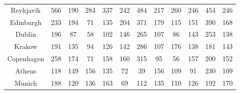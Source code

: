 \documentclass[12pt]{article}
\begin{document}
\begin{landscape}
\begin{table}[h]
\begin{tabular}{c|c|c|c|c|c|c|c|c|c|c|c}
Reykjavik & 566 & 190 & 284 & 337 & 242 & 484 & 217 & 260 & 246 & 454 & 246 \\
Edinburgh & 233 & 194 & 71 & 135 & 204 & 371 & 179 & 115 & 151 & 390 & 168 \\
Dublin & 196 & 87 & 58 & 102 & 146 & 265 & 107 & 86 & 143 & 253 & 138 \\
Krakow & 191 & 135 & 94 & 126 & 142 & 286 & 107 & 176 & 138 & 181 & 143 \\
Copenhagen & 258 & 174 & 71 & 158 & 160 & 315 & 95 & 56 & 157 & 200 & 152 \\
Athens & 118 & 149 & 156 & 135 & 72 & 39 & 156 & 109 & 91 & 230 & 109 \\
Munich & 188 & 120 & 136 & 163 & 69 & 112 & 135 & 110 & 126 & 192 & 170 \\
\end{tabular}
\end{table}
\end{landscape}

\pagebreak
\end{document}
